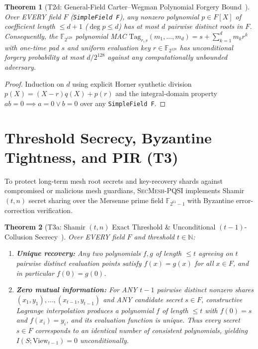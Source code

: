 \documentclass[11pt,reqno]{amsart}
\newtheorem{theorem}{Theorem}[section]
\theoremstyle{definition}
\newcommand{\F}{\mathbb{F}}
\newcommand{\code}[1]{\texttt{\small #1}}
\begin{document}
\begin{theorem}[T2d: General-Field Carter--Wegman Polynomial Forgery Bound~\cite{wegman1981}]
\label{thm:t2d}
Over EVERY field $F$ (\code{SimpleField F}), any nonzero polynomial $p \in F[X]$ of coefficient length $\le d + 1$ ($\deg p \le d$) has at most $d$ pairwise distinct roots in $F$.
Consequently, the $\F_{2^{128}}$ polynomial MAC $\mathrm{Tag}_{r,s}(m_1,\dots,m_d) = s + \sum_{k=1}^d m_k r^k$ with one-time pad $s$ and uniform evaluation key $r \in \F_{2^{128}}$ has unconditional forgery probability at most $d / 2^{128}$ against any computationally unbounded adversary.
\end{theorem}
\begin{proof}
Induction on $d$ using explicit Horner synthetic division $p(X) = (X - r) q(X) + p(r)$ and the integral-domain property $ab = 0 \implies a = 0 \lor b = 0$ over any \code{SimpleField F}.
\end{proof}

\section{Threshold Secrecy, Byzantine Tightness, and PIR (T3)}
\label{sec:threshold}

To protect long-term mesh root secrets and key-recovery shards against compromised or malicious mesh guardians, \textsc{SecMesh-PQSI} implements Shamir $(t,n)$ secret sharing over the Mersenne prime field $\F_{2^{61}-1}$ with Byzantine error-correction verification.

\begin{theorem}[T3a: Shamir $(t,n)$ Exact Threshold \& Unconditional $(t-1)$-Collusion Secrecy~\cite{shamir1979}]
\label{thm:t3a}
Over EVERY field $F$ and threshold $t \in \mathbb{N}$:
\begin{enumerate}[leftmargin=1.8em]
  \item \textbf{Unique recovery:} Any two polynomials $f, g$ of length $\le t$ agreeing on $t$ pairwise distinct evaluation points satisfy $f(x) = g(x)$ for all $x \in F$, and in particular $f(0) = g(0)$.
  \item \textbf{Zero mutual information:} For ANY $t - 1$ pairwise distinct nonzero shares $(x_1, y_1), \dots,\allowbreak (x_{t-1}, y_{t-1})$ and ANY candidate secret $s \in F$, constructive Lagrange interpolation produces a polynomial $f$ of length $\le t$ with $f(0) = s$ and $f(x_i) = y_i$, and its evaluation function is \emph{unique}. Thus every secret $s \in F$ corresponds to an identical number of consistent polynomials, yielding $I(S; \mathrm{View}_{t-1}) = 0$ unconditionally.
\end{enumerate}
\end{theorem}
\end{document}
